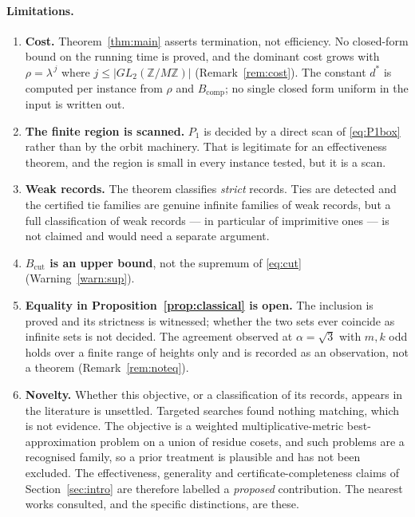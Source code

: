 \documentclass[11pt]{article}
\theoremstyle{definition}
\theoremstyle{remark}
\newcommand{\Z}{\mathbb{Z}}
\begin{document}
\paragraph{Limitations.}
\begin{enumerate}\itemsep2pt
\item \textbf{Cost.} Theorem~\ref{thm:main} asserts termination, not efficiency. No closed-form
bound on the running time is proved, and the dominant cost grows with $\rho=\lambda^{\,j}$ where
$j\le|GL_2(\Z/M\Z)|$ (Remark~\ref{rem:cost}). The constant
$d^{*}$ is computed per instance from $\rho$ and $B_{\mathrm{comp}}$; no single closed form
uniform in the input is written out.
\item \textbf{The finite region is scanned.} $P_1$ is decided by a direct scan of
\eqref{eq:P1box} rather than by the orbit machinery. That is legitimate for an effectiveness
theorem, and the region is small in every instance tested, but it is a scan.
\item \textbf{Weak records.} The theorem classifies \emph{strict} records. Ties are detected and
the certified tie families are genuine infinite families of weak records, but a full
classification of weak records --- in particular of imprimitive ones --- is not claimed and
would need a separate argument.
\item \textbf{$B_{\mathrm{cut}}$ is an upper bound}, not the supremum of \eqref{eq:cut}
(Warning~\ref{warn:sup}).
\item \textbf{Equality in Proposition~\ref{prop:classical} is open.} The inclusion is proved and
its strictness is witnessed; whether the two sets ever coincide as infinite sets is not decided.
The agreement observed at $\alpha=\sqrt3$ with $m,k$ odd holds over a finite range of heights
only and is recorded as an observation, not a theorem (Remark~\ref{rem:noteq}).
\item \textbf{Novelty.} Whether this objective, or a classification of its records, appears in
the literature is unsettled. Targeted searches found nothing matching, which is not evidence.
The objective is a weighted multiplicative-metric best-approximation problem on a union of
residue cosets, and such problems are a recognised family, so a prior treatment is plausible and
has not been excluded. The effectiveness, generality and certificate-completeness claims of
Section~\ref{sec:intro} are therefore labelled a \emph{proposed} contribution. The nearest
works consulted, and the specific distinctions, are these.
\begin{itemize}\itemsep2pt

\end{itemize}
\end{enumerate}
\end{document}
